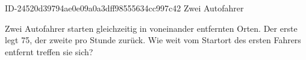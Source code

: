 \begin{exercise}
      {ID-24520d39794ae0e09a0a3dff98555634cc997c42}
      {Zwei Autofahrer}
  \ifproblem\problem\par
    Zwei Autofahrer starten gleichzeitig in  voneinander entfernten Orten.
    Der erste legt 75, der zweite  pro Stunde zurück. Wie weit vom
    Startort des ersten Fahrers entfernt treffen sie sich?
  \fi
\end{exercise}
